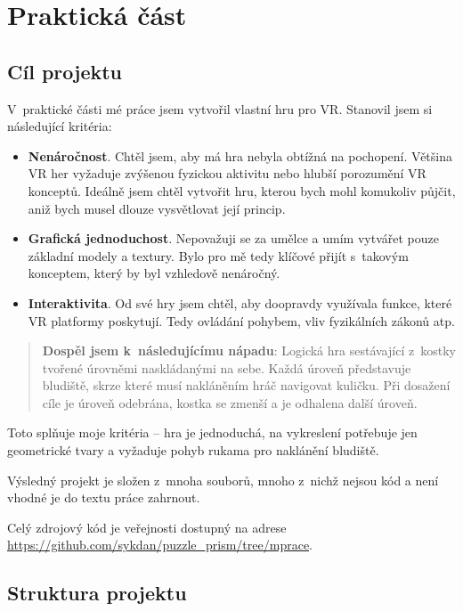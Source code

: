 \part{Praktická část}

\chapter{Cíl projektu}

V~praktické části mé práce jsem vytvořil vlastní hru pro VR. Stanovil jsem si následující kritéria:

\begin{itemize}
  \item \textbf{Nenáročnost}. Chtěl jsem, aby má hra nebyla obtížná na pochopení. Většina VR her vyžaduje zvýšenou fyzickou aktivitu nebo hlubší porozumění VR konceptů. Ideálně jsem chtěl vytvořit hru, kterou bych mohl komukoliv půjčit, aniž bych musel dlouze vysvětlovat její princip.
  \item \textbf{Grafická jednoduchost}. Nepovažuji se za umělce a umím vytvářet pouze základní modely a textury. Bylo pro mě tedy klíčové přijít s~takovým konceptem, který by byl vzhledově nenáročný.
  \item \textbf{Interaktivita}. Od své hry jsem chtěl, aby doopravdy využívala funkce, které VR platformy poskytují. Tedy ovládání pohybem, vliv fyzikálních zákonů atp.
\end{itemize}

\begin{quotation}
  
\textbf{Dospěl jsem k~následujícímu nápadu}: Logická hra sestávající z~kostky tvořené úrovněmi naskládanými na sebe. Každá úroveň představuje bludiště, skrze které musí nakláněním hráč navigovat kuličku. Při dosažení cíle je úroveň odebrána, kostka se zmenší a je odhalena další úroveň.
\end{quotation}

Toto splňuje moje kritéria -- hra je jednoduchá, na vykreslení potřebuje jen geometrické tvary a vyžaduje pohyb rukama pro naklánění bludiště.

Výsledný projekt je složen z~mnoha souborů, mnoho z~nichž nejsou kód a není vhodné je do textu práce zahrnout. 

Celý zdrojový kód je veřejnosti dostupný na adrese \url{https://github.com/sykdan/puzzle_prism/tree/mprace}. 

\chapter{Struktura projektu}

